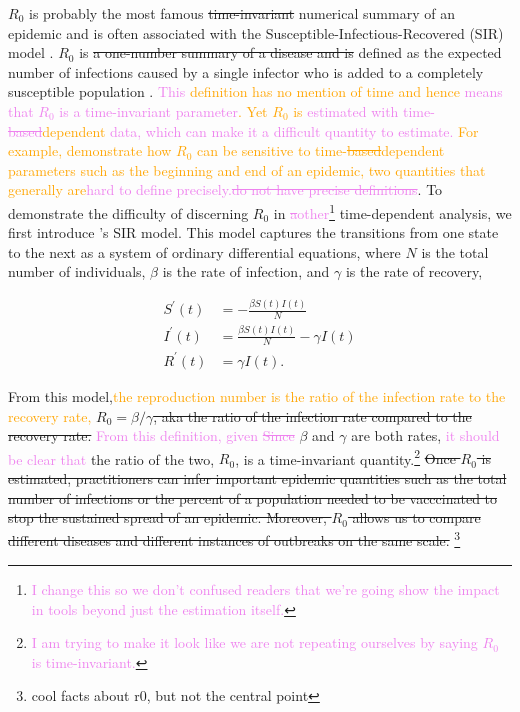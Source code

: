 \documentclass[
  shortnames]{jss}
\begin{document}
\(R_0\) is probably the most famous \sout{time-invariant} numerical
summary of an epidemic and is often associated with the
Susceptible-Infectious-Recovered (SIR) model \citep{hethcote2000}.
\(R_0\) is \sout{a one-number summary of a disease and is }defined as
the expected number of infections caused by a single infector who is
added to a completely susceptible population \citep{anderson1992}.
\textcolor{violet}{This \textcolor{orange}{definition has no mention of time and hence} means that $R_0$ is a time-invariant parameter\textcolor{orange}{. Yet $R_0$ is} estimated with time-\sout{based}\textcolor{orange}{dependent} data, which can make it a difficult quantity to estimate.}
\textcolor{orange}{For example, \cite{Gallagher2020} demonstrate how $R_0$ can be sensitive to time-\sout{based}\textcolor{orange}{dependent} parameters such as the beginning and end of an epidemic, two quantities that generally are}\textcolor{violet}{hard to define precisely.\sout{do not have precise definitions}}.
To demonstrate the difficulty of discerning \(R_0\) in
\textcolor{violet}{\sout{a}other}\footnote{\textcolor{violet}{I change this so we don't confused readers that we're going show the impact in tools beyond just the estimation itself.}}
time-dependent analysis, we first introduce \citet{Kermack1927}'s SIR
model. This model captures the transitions from one state to the next as
a system of ordinary differential equations, where \(N\) is the total
number of individuals, \(\beta\) is the rate of infection, and
\(\gamma\) is the rate of recovery,

\begin{align}\label{eq:sir-ode}
    S^\prime(t) &= -\frac{\beta S(t)I(t)}{N} \\
    I^\prime(t) &= \frac{\beta S(t)I(t)}{N} - \gamma I(t) \nonumber\\
    R^\prime(t) &= \gamma I(t) \nonumber.
\end{align}

From this
model,\textcolor{orange}{the reproduction number is the ratio of the infection rate to the recovery rate,}
\(R_0 = \beta/\gamma\)\sout{, aka the ratio of the infection rate compared to the recovery rate.}
\textcolor{violet}{From this definition, given 
\sout{Since}} \(\beta\) and \(\gamma\) are both rates,
\textcolor{violet}{it should be clear that} the ratio of the two,
\(R_0\), is a time-invariant
quantity.\footnote{\textcolor{violet}{I am trying to make it look like we are not repeating ourselves by saying $R_0$ is time-invariant.}}
\sout{ Once $R_0$ is estimated, practitioners can infer important epidemic quantities such as the total number of infections or the percent of a population needed to be vacccinated to stop the sustained spread of an epidemic.  Moreover, $R_0$ allows us to compare different diseases and different instances of outbreaks on the same scale. }\footnote{cool
  facts about r0, but not the central point}
\end{document}
